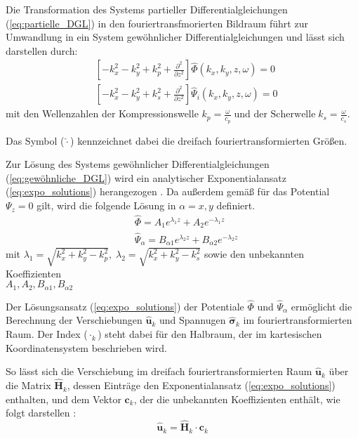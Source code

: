 Die Transformation des Systems partieller Differentialgleichungen (\ref{eq:partielle_DGL}) in den fouriertransfmorierten Bildraum führt zur Umwandlung in ein System gewöhnlicher Differentialgleichungen und lässt sich darstellen durch:
\begin{subequations}\label{eq:gewöhnliche_DGL}
	{	\begin{align}
			&\left[-k_x^{2}-k_y^{2}+k_p^{2}+\frac{\partial^{2}}{\partial z^{2}}\right]
			\hat{\Phi}(k_x,k_y,z,\omega) = 0 \label{eq:phi_helmholtz}\\[6pt]
			&\left[-k_x^{2}-k_y^{2}+k_s^{2}+\frac{\partial^{2}}{\partial z^{2}}\right]
			\hat{\Psi}_{i}(k_x,k_y,z,\omega) = 0 \label{eq:psi_helmholtz}
		\end{align}
	}
\end{subequations}
mit den Wellenzahlen der Kompressionswelle \( k_p = \frac{\omega}{c_p} \;\text{und der Scherwelle}\; k_s = \frac{\omega}{c_s} \).

Das Symbol ($\hat{\cdot}$) kennzeichnet dabei die dreifach fouriertransformierten Größen.

Zur Lösung des Systems gewöhnlicher Differentialgleichungen (\ref{eq:gewöhnliche_DGL}) wird ein analytischer Exponentialansatz (\ref{eq:expo_solutions}) herangezogen \citep{Wolf1985}. Da außerdem gemäß \cite{Long1967} für das Potential $\Psi_{z} = 0$ gilt, wird die folgende Lösung in $\alpha=x,y$ definiert.
\begin{subequations}\label{eq:expo_solutions}
	{\begin{align}
			&\hat{\Phi} = A_{1} e^{\lambda_{1} z} + A_{2} e^{-\lambda_{1} z}\label{eq:phi_sol}\\[4pt]
			&\hat{\Psi}_{\alpha} = B_{\alpha1} e^{\lambda_{2} z} + B_{\alpha2} e^{-\lambda_{2} z}\label{eq:psi_sol}
		\end{align}
	}
\end{subequations}
mit \( \lambda_{1} = \sqrt{k_x^{2}+k_y^{2}-k_p^{2}},\;
\lambda_{2} = \sqrt{k_x^{2}+k_y^{2}-k_s^{2}} \)
sowie den unbekannten Koeffizienten\\
\(A_1, A_2, B_{\alpha1}, B_{\alpha2}\)

Der Lösungsansatz (\ref{eq:expo_solutions}) der Potentiale $\hat{\Phi}$ und $\hat{\Psi}_{\alpha}$ ermöglicht die Berechnung der Verschiebungen \(\hat{\mathbf{u}}_{k}\) und Spannugen \(\hat{\boldsymbol{\sigma}}_{k}\) im fouriertransformierten Raum. 
Der Index (\({\cdot}_k\)) steht dabei für den Halbraum, der im kartesischen Koordinatensystem beschrieben wird.

So lässt sich die Verschiebung im dreifach fouriertransformierten Raum \(\hat{\mathbf{u}}_{k}\) über die Matrix $\hat{\mathbf{H}}_{k}$, dessen Einträge den Exponentialansatz (\ref{eq:expo_solutions}) enthalten, und dem Vektor $\mathbf{c}_k$, der die unbekannten Koeffizienten enthält, wie folgt darstellen \citep{Fruehe2010}: 
\begin{equation}\label{eq:displ_hs}
	\hat{\mathbf{u}}_{k} = \hat{\mathbf{H}}_{k}\cdot \mathbf{c}_{k}
\end{equation}

